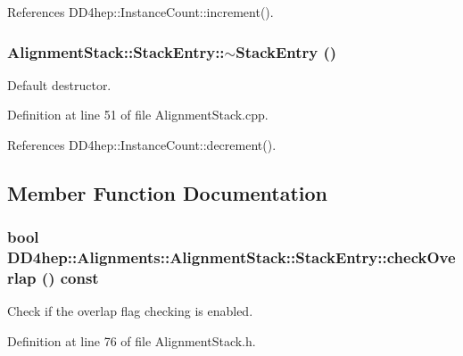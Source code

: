 References DD4hep::InstanceCount::increment().\hypertarget{struct_d_d4hep_1_1_alignments_1_1_alignment_stack_1_1_stack_entry_ae652df4f6d2a322e1e3ec6b023782b0f}{
\subsubsection[{$\sim$StackEntry}]{\setlength{\rightskip}{0pt plus 5cm}AlignmentStack::StackEntry::$\sim$StackEntry ()}}
\label{struct_d_d4hep_1_1_alignments_1_1_alignment_stack_1_1_stack_entry_ae652df4f6d2a322e1e3ec6b023782b0f}


Default destructor. 

Definition at line 51 of file AlignmentStack.cpp.

References DD4hep::InstanceCount::decrement().

\subsection{Member Function Documentation}
\hypertarget{struct_d_d4hep_1_1_alignments_1_1_alignment_stack_1_1_stack_entry_a9d5a991296bc17452aa59fa2a49730f0}{
\subsubsection[{checkOverlap}]{\setlength{\rightskip}{0pt plus 5cm}bool DD4hep::Alignments::AlignmentStack::StackEntry::checkOverlap () const}}
\label{struct_d_d4hep_1_1_alignments_1_1_alignment_stack_1_1_stack_entry_a9d5a991296bc17452aa59fa2a49730f0}


Check if the overlap flag checking is enabled. 

Definition at line 76 of file AlignmentStack.h.

